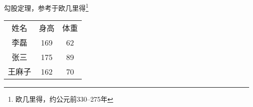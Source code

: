 \documentclass{article}
\begin{document}
    勾股定理，参考于欧几里得\footnote{欧几里得，约公元前330--275年}\\
	\begin{tabular}{c c c}
		姓名 & 身高 & 体重\\
		李磊 & 169 & 62\\
		张三 & 175 & 89\\
		王麻子 & 162 & 70\footnotemark[2]\\
	\end{tabular}
\end{document}

